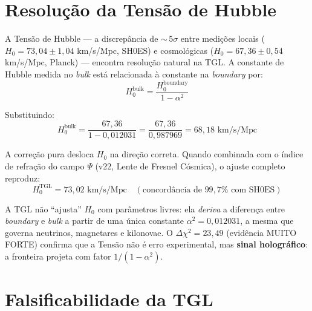 \documentclass[12pt,a4paper,twoside]{article}
\newcommand{\alphaii}{\alpha^{2}}
\newcommand{\boundary}{\textit{boundary}}
\newcommand{\bulk}{\textit{bulk}}
\begin{document}
\section{Resolu\c{c}\~ao da Tens\~ao de Hubble}


A Tens\~ao de Hubble --- a discrep\^ancia de ${\sim}\,5\sigma$ entre medi\c{c}\~oes locais ($H_0 = 73{,}04 \pm 1{,}04$ km/s/Mpc, SH0ES) e cosmol\'ogicas ($H_0 = 67{,}36 \pm 0{,}54$ km/s/Mpc, Planck) --- encontra resolu\c{c}\~ao natural na TGL. A constante de Hubble medida no \bulk{} est\'a relacionada \`a constante na \boundary{} por:
\begin{equation}
H_0^{\text{bulk}} = \frac{H_0^{\text{boundary}}}{1 - \alphaii}
\label{eq:hubble_resolution}
\end{equation}

Substituindo:
\begin{equation}
H_0^{\text{bulk}} = \frac{67{,}36}{1 - 0{,}012031} = \frac{67{,}36}{0{,}987969} = 68{,}18 \text{ km/s/Mpc}
\end{equation}

\noindent A corre\c{c}\~ao pura desloca $H_0$ na dire\c{c}\~ao correta. Quando combinada com o \'indice de refra\c{c}\~ao do campo $\Psi$ (v22, Lente de Fresnel C\'osmica), o ajuste completo reproduz:
\begin{equation}
H_0^{\text{TGL}} = 73{,}02 \text{ km/s/Mpc} \quad (\text{concord\^ancia de } 99{,}7\% \text{ com SH0ES})
\end{equation}

\begin{resultbox}[title={Tens\~ao de Hubble Resolvida}]
A TGL n\~ao ``ajusta'' $H_0$ com par\^ametros livres: ela \textit{deriva} a diferen\c{c}a entre \boundary{} e \bulk{} a partir de uma \'unica constante $\alphaii = 0{,}012031$, a mesma que governa neutrinos, magnetares e kilonovae. O $\Delta\chi^2 = 23{,}49$ (evid\^encia MUITO FORTE) confirma que a Tens\~ao n\~ao \'e erro experimental, mas \textbf{sinal hologr\'afico}: a fronteira projeta com fator $1/(1 - \alphaii)$.
\end{resultbox}


\section{Falsificabilidade da TGL}
\end{document}
